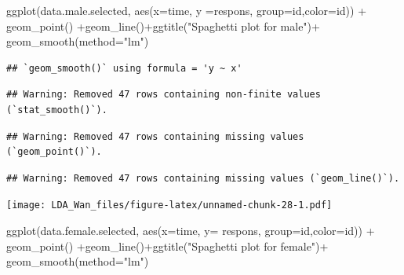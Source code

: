 \documentclass[
]{article}
\newenvironment{Shaded}{\begin{snugshade}}{\end{snugshade}}
\newcommand{\AttributeTok}[1]{\textcolor[rgb]{0.77,0.63,0.00}{#1}}
\newcommand{\FunctionTok}[1]{\textcolor[rgb]{0.00,0.00,0.00}{#1}}
\newcommand{\NormalTok}[1]{#1}
\newcommand{\SpecialCharTok}[1]{\textcolor[rgb]{0.00,0.00,0.00}{#1}}
\newcommand{\StringTok}[1]{\textcolor[rgb]{0.31,0.60,0.02}{#1}}
\begin{document}
\begin{Shaded}
\begin{Highlighting}[]
\FunctionTok{ggplot}\NormalTok{(data.male.selected, }\FunctionTok{aes}\NormalTok{(}\AttributeTok{x=}\NormalTok{time, }\AttributeTok{y =}\NormalTok{respons, }\AttributeTok{group=}\NormalTok{id,}\AttributeTok{color=}\NormalTok{id)) }\SpecialCharTok{+} \FunctionTok{geom\_point}\NormalTok{()  }\SpecialCharTok{+}\FunctionTok{geom\_line}\NormalTok{()}\SpecialCharTok{+}\FunctionTok{ggtitle}\NormalTok{(}\StringTok{"Spaghetti plot for male"}\NormalTok{)}\SpecialCharTok{+} \FunctionTok{geom\_smooth}\NormalTok{(}\AttributeTok{method=}\StringTok{"lm"}\NormalTok{)}
\end{Highlighting}
\end{Shaded}

\begin{verbatim}
## `geom_smooth()` using formula = 'y ~ x'
\end{verbatim}

\begin{verbatim}
## Warning: Removed 47 rows containing non-finite values (`stat_smooth()`).
\end{verbatim}

\begin{verbatim}
## Warning: Removed 47 rows containing missing values (`geom_point()`).
\end{verbatim}

\begin{verbatim}
## Warning: Removed 47 rows containing missing values (`geom_line()`).
\end{verbatim}

\texttt{[image: LDA\_Wan\_files/figure-latex/unnamed-chunk-28-1.pdf]}

\begin{Shaded}
\begin{Highlighting}[]
\FunctionTok{ggplot}\NormalTok{(data.female.selected, }\FunctionTok{aes}\NormalTok{(}\AttributeTok{x=}\NormalTok{time, }\AttributeTok{y=}\NormalTok{ respons, }\AttributeTok{group=}\NormalTok{id,}\AttributeTok{color=}\NormalTok{id)) }\SpecialCharTok{+} \FunctionTok{geom\_point}\NormalTok{()  }\SpecialCharTok{+}\FunctionTok{geom\_line}\NormalTok{()}\SpecialCharTok{+}\FunctionTok{ggtitle}\NormalTok{(}\StringTok{"Spaghetti plot for female"}\NormalTok{)}\SpecialCharTok{+} \FunctionTok{geom\_smooth}\NormalTok{(}\AttributeTok{method=}\StringTok{"lm"}\NormalTok{)}
\end{Highlighting}
\end{Shaded}
\end{document}
